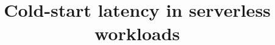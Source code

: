 \documentclass{article}
\begin{document}
\title{Cold-start latency in serverless workloads}
\maketitle
\end{document}
